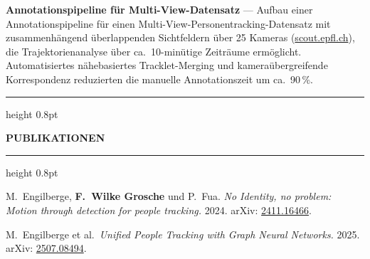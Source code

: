 \documentclass[a4paper,10pt]{article}
\newlength{\mainwidth}
\newlength{\mainpadding}
\newcommand{\mainsection}[1]{%
  \vspace{14pt}%
  {\color{ruleColor}\hrule height 0.8pt}%
  \vspace{6pt}%
  {\color{mainHeading}\bfseries\large\MakeUppercase{#1}}%
  \vspace{4pt}%
  {\color{ruleColor}\hrule height 0.8pt}%
  \vspace{8pt}\par%
}
\begin{document}
\begin{minipage}[t][\textheight]{\mainwidth}
\begin{minipage}[t]{\dimexpr\mainwidth-2\mainpadding\relax}
    {\color{mainText}\small
      \textbf{Annotationspipeline f\"ur Multi-View-Datensatz} ---
      Aufbau einer Annotationspipeline f\"ur einen Multi-View-Personentracking-Datensatz
      mit zusammenh\"angend \"uberlappenden Sichtfeldern \"uber 25 Kameras
      (\href{https://scout.epfl.ch/}{scout.epfl.ch}), die Trajektorienanalyse \"uber
      ca.\ 10-min\"utige Zeitr\"aume erm\"oglicht. Automatisiertes n\"ahebasiertes
      Tracklet-Merging und kamera\"ubergreifende Korrespondenz reduzierten die manuelle
      Annotationszeit um ca.\ 90\,\%.
    }

    \mainsection{Publikationen}
    {\color{mainText}\small
      \begin{enumerate}[leftmargin=1.4em, itemsep=4pt, label={[\arabic*]}]
        \item M.\ Engilberge, \textbf{F.\ Wilke Grosche} und P.\ Fua.
              \textit{No Identity, no problem: Motion through detection for people tracking.}
              2024. arXiv: \href{https://arxiv.org/abs/2411.16466}{2411.16466}.
        \item M.\ Engilberge et al.\
              \textit{Unified People Tracking with Graph Neural Networks.}
              2025. arXiv: \href{https://arxiv.org/abs/2507.08494}{2507.08494}.
      \end{enumerate}
    }

  \end{minipage}
\end{minipage}
\end{document}
